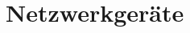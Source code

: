 \documentclass[xcolor=dvipsnames]{beamer}
\begin{document}
\section{Netzwerkgeräte}
\begin{frame}
\begin{figure}%
    \centering
    \qquad
\end{figure}
\end{frame}

\begin{frame}
\begin{figure}%
    \centering
    \qquad
\end{figure}
\end{frame}
\end{document}
